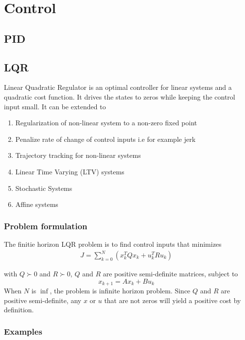 \chapter{Control}
\section{PID}
\section{LQR}
Linear Quadratic Regulator is an optimal controller for linear systems and a quadratic cost function. It drives the states to zeros while keeping the control input small. It can be extended to
\begin{enumerate}[topsep=0pt,itemsep=2pt,parsep=0pt,partopsep=0pt]
    \item Regularization of non-linear system to a non-zero fixed point
    \item Penalize rate of change of control inputs i.e for example jerk
    \item Trajectory tracking for non-linear systems
    \item Linear Time Varying (LTV) systems
    \item Stochastic Systems
    \item Affine systems
\end{enumerate}
\subsection{Problem formulation}
The finitie horizon LQR problem is to find control inputs that minimizes 
\begin{align}
    J=\sum_{k=0}^N(x_k^TQx_k + u_k^TRu_k) \label{eq:chap2_lqr_cost}
\end{align}

with $Q\succ0$ and $R\succ0$, $Q$ and $R$ are positive semi-definite matrices, subject to 
$$x_{k+1}=Ax_{k}+Bu_{k}$$
When $N$ is $\inf$, the problem is infinite horizon problem.
Since $Q$ and $R$ are positive semi-definite, any $x$ or $u$ that are not zeros will yield a positive cost by definition.
\subsection{Examples}
